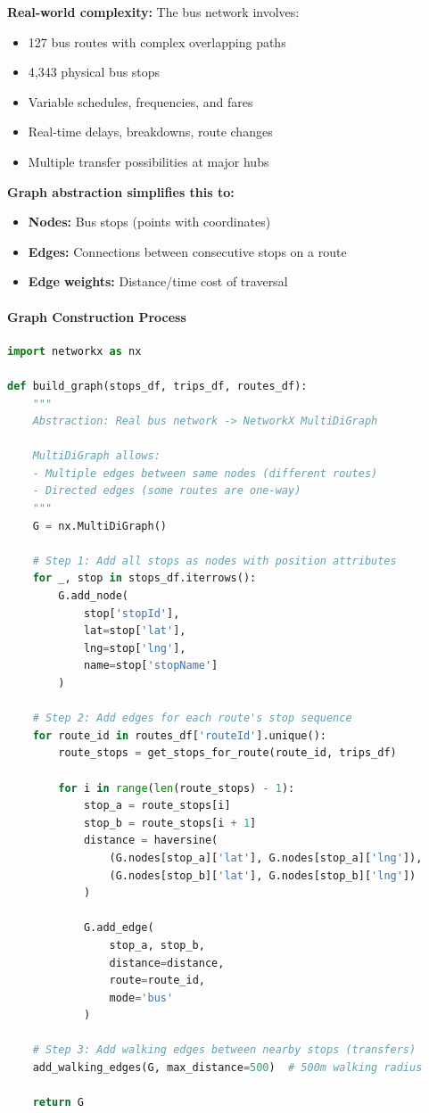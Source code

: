 \textbf{Real-world complexity:} The bus network involves:
\begin{itemize}[noitemsep]
    \item 127 bus routes with complex overlapping paths
    \item 4,343 physical bus stops
    \item Variable schedules, frequencies, and fares
    \item Real-time delays, breakdowns, route changes
    \item Multiple transfer possibilities at major hubs
\end{itemize}

\textbf{Graph abstraction simplifies this to:}
\begin{itemize}[noitemsep]
    \item \textbf{Nodes:} Bus stops (points with coordinates)
    \item \textbf{Edges:} Connections between consecutive stops on a route
    \item \textbf{Edge weights:} Distance/time cost of traversal
\end{itemize}

\paragraph{Graph Construction Process}

\begin{lstlisting}[language=Python, caption={Building the Bus Network Graph (graph\_cache.py)}]
import networkx as nx

def build_graph(stops_df, trips_df, routes_df):
    """
    Abstraction: Real bus network -> NetworkX MultiDiGraph
    
    MultiDiGraph allows:
    - Multiple edges between same nodes (different routes)
    - Directed edges (some routes are one-way)
    """
    G = nx.MultiDiGraph()
    
    # Step 1: Add all stops as nodes with position attributes
    for _, stop in stops_df.iterrows():
        G.add_node(
            stop['stopId'],
            lat=stop['lat'],
            lng=stop['lng'],
            name=stop['stopName']
        )
    
    # Step 2: Add edges for each route's stop sequence
    for route_id in routes_df['routeId'].unique():
        route_stops = get_stops_for_route(route_id, trips_df)
        
        for i in range(len(route_stops) - 1):
            stop_a = route_stops[i]
            stop_b = route_stops[i + 1]
            distance = haversine(
                (G.nodes[stop_a]['lat'], G.nodes[stop_a]['lng']),
                (G.nodes[stop_b]['lat'], G.nodes[stop_b]['lng'])
            )
            
            G.add_edge(
                stop_a, stop_b,
                distance=distance,
                route=route_id,
                mode='bus'
            )
    
    # Step 3: Add walking edges between nearby stops (transfers)
    add_walking_edges(G, max_distance=500)  # 500m walking radius
    
    return G
\end{lstlisting}

